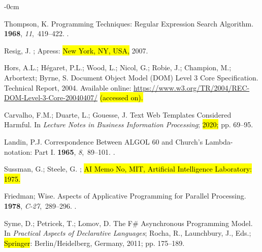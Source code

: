 \documentclass[software,article,accept,pdftex,moreauthors]{Definitions/mdpi}
\begin{document}
\begin{adjustwidth}{-\extralength}{0cm}
\begin{thebibliography}{999}
Thompson, K.
\newblock Programming Techniques: Regular Expression Search Algorithm.
 {\bf 1968}, {\em 11},~419–422.
.

Resig, J.
; Apress: \hl{New York, NY, USA,} 2007.

Hors, A.L.; Hégaret, P.L.; Wood, L.; Nicol, G.; Robie, J.; Champion, M.;
  Arbortext; Byrne, S.
\newblock Document Object Model (DOM) Level 3 Core Specification.
\newblock Technical Report, 2004. Available online: \url{https://www.w3.org/TR/2004/REC-DOM-Level-3-Core-20040407/} \hl{(accessed on).}

Carvalho, F.M.; Duarte, L.; Gouesse, J.
\newblock Text Web Templates Considered Harmful.
\newblock In {\em Lecture Notes in Business Information Processing}; \hl{{2020};} %
 pp. 69--95.

Landin, P.J.
\newblock Correspondence Between ALGOL 60 and Church's Lambda-notation: Part I.
 {\bf 1965}, {\em 8},~89--101.
.

Sussman, G.; Steele, G.
; \hl{AI Memo
  No, MIT, Artificial Intelligence Laboratory:  1975.} %


Friedman; Wise.
\newblock Aspects of Applicative Programming for Parallel Processing.
 {\bf 1978}, {\em
  C-27},~289--296.
.

Syme, D.; Petricek, T.; Lomov, D.
\newblock The F{\#} Asynchronous Programming Model.
\newblock In \emph{Practical Aspects of Declarative Languages};
  Rocha, R., Launchbury, J., Eds.; \hl{Springer}: Berlin/Heidelberg, Germany, 2011; pp. 175--189.


\end{thebibliography}
\end{adjustwidth}
\end{document}
